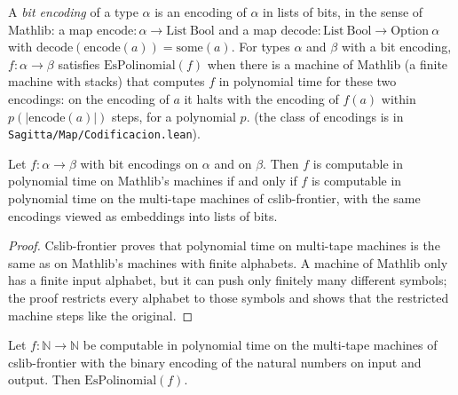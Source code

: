 \begin{definition}
  \label{def:machines-codbits}
  \leanok
  A \emph{bit encoding} of a type $\alpha$ is an encoding of $\alpha$ in lists of bits, in the sense of
  Mathlib: a map $\mathrm{encode} : \alpha \to \mathrm{List}\ \mathrm{Bool}$ and a map
  $\mathrm{decode} : \mathrm{List}\ \mathrm{Bool} \to \mathrm{Option}\ \alpha$ with
  $\mathrm{decode}(\mathrm{encode}(a)) = \mathrm{some}(a)$. For types $\alpha$ and $\beta$ with a bit
  encoding, $f : \alpha \to \beta$ satisfies $\mathrm{EsPolinomial}(f)$ when there is a machine of
  Mathlib (a finite machine with stacks) that computes $f$ in polynomial time for these two encodings:
  on the encoding of $a$ it halts with the encoding of $f(a)$ within $p(|\mathrm{encode}(a)|)$ steps, for
  a polynomial $p$.
  \own{}
  \infrastructure{}
  (the class of encodings is in \texttt{Sagitta/Map/Codificacion.lean}).
\end{definition}

\begin{theorem}
  \label{thm:machines-bridge}
  \leanok
  Let $f : \alpha \to \beta$ with bit encodings on $\alpha$ and on $\beta$. Then $f$ is computable in
  polynomial time on Mathlib's machines if and only if $f$ is computable in polynomial time on the
  multi-tape machines of cslib-frontier, with the same encodings viewed as embeddings into lists of
  bits.
  \own{}
  \infrastructure{}
\end{theorem}

\begin{proof}
  \leanok
  Cslib-frontier proves that polynomial time on multi-tape machines is the same as on Mathlib's machines
  with finite alphabets. A machine of Mathlib only has a finite input alphabet, but it can push only
  finitely many different symbols; the proof restricts every alphabet to those symbols and shows that the
  restricted machine steps like the original.
\end{proof}

\begin{theorem}
  \label{thm:machines-bridge-nat}
  \leanok
  Let $f : \mathbb{N} \to \mathbb{N}$ be computable in polynomial time on the multi-tape machines of
  cslib-frontier with the binary encoding of the natural numbers on input and output. Then
  $\mathrm{EsPolinomial}(f)$.
  \own{}
  \infrastructure{}
\end{theorem}

